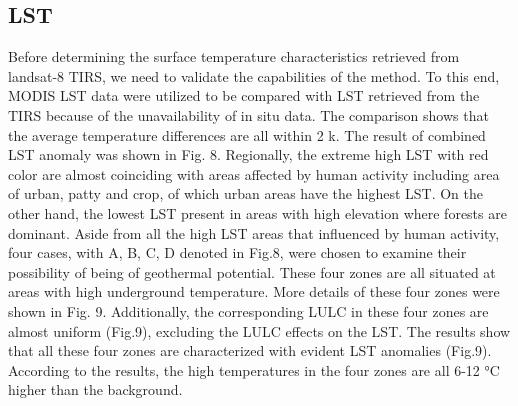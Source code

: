 \subsection{LST}

Before determining the surface temperature characteristics retrieved from landsat-8 TIRS, we need to validate the capabilities of the method. To this end, MODIS LST data were utilized to be compared with LST retrieved from the TIRS because of the unavailability of in situ data. The comparison shows that the average temperature differences are all within 2 k. The result of combined LST anomaly was shown in Fig. 8. Regionally, the extreme high LST with red color are almost coinciding with areas affected by human activity including area of urban, patty and crop, of which urban areas have the highest LST. On the other hand, the lowest LST present in areas with high elevation where forests are dominant. Aside from all the high LST areas that influenced by human activity, four cases, with A, B, C, D denoted in Fig.8, were chosen to examine their possibility of being of geothermal potential. These four zones are all situated at areas with high underground temperature. More details of these four zones were shown in Fig. 9. Additionally, the corresponding LULC in these four zones are almost uniform (Fig.9), excluding the LULC effects on the LST. The results show that all these four zones are characterized with evident LST anomalies (Fig.9). According to the results, the high temperatures in the four zones are all 6-12 °C higher than the background. 